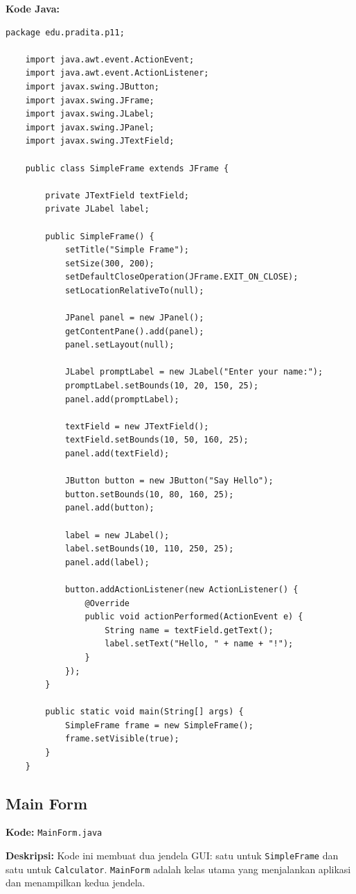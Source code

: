 \textbf{Kode Java:}
\begin{lstlisting}[style=JavaStyle]
	package edu.pradita.p11;
	
	import java.awt.event.ActionEvent;
	import java.awt.event.ActionListener;
	import javax.swing.JButton;
	import javax.swing.JFrame;
	import javax.swing.JLabel;
	import javax.swing.JPanel;
	import javax.swing.JTextField;
	
	public class SimpleFrame extends JFrame {
		
		private JTextField textField;
		private JLabel label;
		
		public SimpleFrame() {
			setTitle("Simple Frame");
			setSize(300, 200);
			setDefaultCloseOperation(JFrame.EXIT_ON_CLOSE);
			setLocationRelativeTo(null);
			
			JPanel panel = new JPanel();
			getContentPane().add(panel);
			panel.setLayout(null);
			
			JLabel promptLabel = new JLabel("Enter your name:");
			promptLabel.setBounds(10, 20, 150, 25);
			panel.add(promptLabel);
			
			textField = new JTextField();
			textField.setBounds(10, 50, 160, 25);
			panel.add(textField);
			
			JButton button = new JButton("Say Hello");
			button.setBounds(10, 80, 160, 25);
			panel.add(button);
			
			label = new JLabel();
			label.setBounds(10, 110, 250, 25);
			panel.add(label);
			
			button.addActionListener(new ActionListener() {
				@Override
				public void actionPerformed(ActionEvent e) {
					String name = textField.getText();
					label.setText("Hello, " + name + "!");
				}
			});
		}
		
		public static void main(String[] args) {
			SimpleFrame frame = new SimpleFrame();
			frame.setVisible(true);
		}
	}
\end{lstlisting}



\subsection{Main Form}

\textbf{Kode:} \texttt{MainForm.java}

\textbf{Deskripsi:} Kode ini membuat dua jendela GUI: satu untuk \texttt{SimpleFrame} dan satu untuk \texttt{Calculator}. \texttt{MainForm} adalah kelas utama yang menjalankan aplikasi dan menampilkan kedua jendela.

